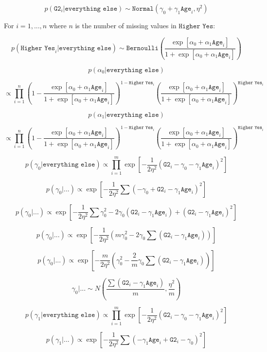 \documentclass[11pt]{article}
\begin{document}
$$p(\texttt{G2}_i|\texttt{everything else}) \sim \texttt{Normal}(\gamma_0+\gamma_1\texttt{Age}_i, \eta^2)$$

For $i=1,...,n$ where $n$ is the number of missing values in $\texttt{Higher Yes}$:

$$p(\texttt{Higher Yes}_i|\texttt{everything else}) \sim \texttt{Bernoulli}(\frac{\exp[\alpha_0+\alpha_1\texttt{Age}_i]}{1+\exp[\alpha_0+\alpha_1\texttt{Age}_i]})$$

$$p(\alpha_0|\texttt{everything else})$$

$$\propto \prod_{i=1}^{n}(1-\frac{\exp[\alpha_0+\alpha_1\texttt{Age}_i]}{1+\exp[\alpha_0+\alpha_1\texttt{Age}_i]})^{1-\texttt{Higher Yes}_i}(\frac{\exp[\alpha_0+\alpha_1\texttt{Age}_i]}{1+\exp[\alpha_0+\alpha_1\texttt{Age}_i]})^{\texttt{Higher Yes}_i}$$

$$p(\alpha_1|\texttt{everything else})$$

$$\propto \prod_{i=1}^{n}(1-\frac{\exp[\alpha_0+\alpha_1\texttt{Age}_i]}{1+\exp[\alpha_0+\alpha_1\texttt{Age}_i]})^{1-\texttt{Higher Yes}_i}(\frac{\exp[\alpha_0+\alpha_1\texttt{Age}_i]}{1+\exp[\alpha_0+\alpha_1\texttt{Age}_i]})^{\texttt{Higher Yes}_i}$$

$$p(\gamma_0|\texttt{everything else}) \propto \prod_{i=1}^m  \exp \left[-\frac{1}{2\eta^2} (\texttt{G2}_i - \gamma_0 - \gamma_1 \texttt{Age}_i)^2 \right]$$

$$p(\gamma_0 | ...) \propto \exp \left[ -\frac{1}{2\eta^2} \sum (-\gamma_0 + \texttt{G2}_i - \gamma_1 \texttt{Age}_i)^2 \right]$$

$$p(\gamma_0 | ...) \propto \exp \left[ -\frac{1}{2\eta^2} \sum \gamma_0^2 - 2\gamma_0(\texttt{G2}_i - \gamma_1 \texttt{Age}_i) 
+  (\texttt{G2}_i - \gamma_1 \texttt{Age}_i)^2 \right]$$

$$p(\gamma_0 | ...) \propto \exp \left[ -\frac{1}{2\eta^2} (m\gamma_0^2 - 2\gamma_0\sum(\texttt{G2}_i - \gamma_1 \texttt{Age}_i)) \right]$$

$$p(\gamma_0 | ...) \propto \exp \left[ -\frac{m}{2\eta^2} (\gamma_0^2 - \frac{2}{m}\gamma_0\sum(\texttt{G2}_i - \gamma_1 \texttt{Age}_i)) \right]$$

$$\gamma_0 | ... \sim N\left( \frac{\sum(\texttt{G2}_i - \gamma_1 \texttt{Age}_i)}{m}, \frac{\eta^2}{m} \right)$$

$$p(\gamma_1|\texttt{everything else}) \propto \prod_{i=1}^m  \exp \left[-\frac{1}{2\eta^2} (\texttt{G2}_i - \gamma_0 - \gamma_1 \texttt{Age}_i)^2 \right]
$$

$$p(\gamma_1 | ...) \propto \exp \left[ -\frac{1}{2\eta^2} \sum (- \gamma_1 \texttt{Age}_i + \texttt{G2}_i -\gamma_0 )^2 \right]$$
\end{document}
